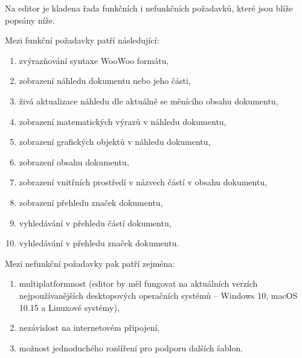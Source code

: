 Na editor je kladena řada funkčních i nefunkčních požadavků, které jsou blíže popsány níže.

Mezi funkční požadavky patří následující:

\begin{enumerate}[label=\textbf{F\arabic*}, ref=F\arabic*]
    \item \label{F1} zvýrazňování syntaxe WooWoo formátu,
    \item \label{F2} zobrazení náhledu dokumentu nebo jeho části,
    \item \label{F3} živá aktualizace náhledu dle aktuálně se měnícího obsahu dokumentu,
    \item \label{F4} zobrazení matematických výrazů v náhledu dokumentu,
    \item \label{F5} zobrazení grafických objektů v náhledu dokumentu,
    \item \label{F6} zobrazení obsahu dokumentu,
    \item \label{F7} zobrazení vnitřních prostředí v názvech částí v obsahu dokumentu,
    \item \label{F8} zobrazení přehledu značek dokumentu,
    \item \label{F9} vyhledávání v přehledu částí dokumentu,
    \item \label{F10} vyhledávání v přehledu značek dokumentu.
\end{enumerate}

Mezi nefunkční požadavky pak patří zejména:

\begin{enumerate}[label=\textbf{N\arabic*}, ref=N\arabic*]
    \item \label{N1} multiplatformnost (editor by měl fungovat na aktuálních verzích nejpoužívanějších desktopových
        operačních systémů – Windows 10, macOS 10.15 a Linuxové systémy),
    \item \label{N2} nezávislost na internetovém připojení,
    \item \label{N3} možnost jednoduchého rozšíření pro podporu dalších šablon.
\end{enumerate}
